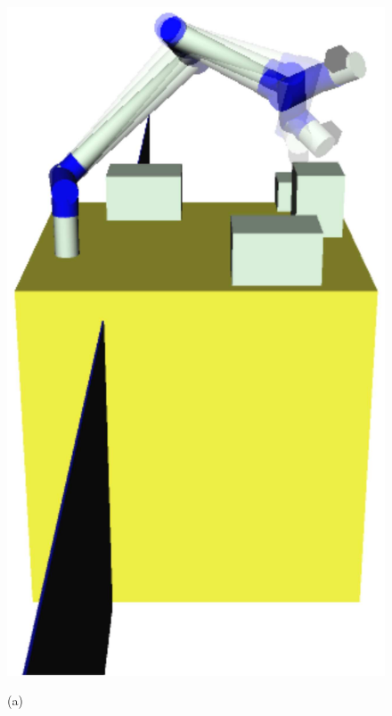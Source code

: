 %
\begin{figure}[t]
  \centering
  \begin{minipage}[h]{0.4\linewidth}
    \centering
    \includegraphics[width=1.0\linewidth]{fig/chapter4/spatial/WS.eps}
    \footnotesize\par{(a)}
  \end{minipage}
  \begin{minipage}[h]{0.4\linewidth}
    \centering

\end{minipage}
\end{figure}
